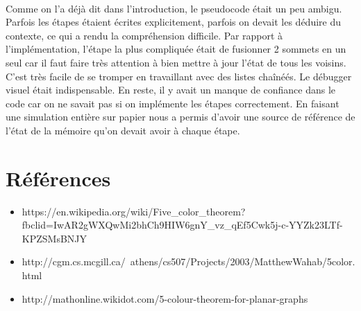 \documentclass[a4paper, 11pt, oneside]{article}
\begin{document}
	\paragraph{}
	Comme on l'a déjà dit dans l'introduction, le pseudocode était un peu ambigu. Parfois les étapes étaient écrites explicitement, parfois on devait les déduire du contexte, ce qui a rendu la compréhension difficile. Par rapport à l'implémentation, l'étape la plus compliquée était de fusionner 2 sommets en un seul car il faut faire très attention à bien mettre à jour l'état de tous les voisins. C'est très facile de se tromper en travaillant avec des listes chaînéés. Le débugger visuel était indispensable. En reste, il y avait un manque de confiance dans le code car on ne savait pas si on implémente les étapes correctement. En faisant une simulation entière sur papier nous a permis d'avoir une source de référence de l'état de la mémoire qu'on devait avoir à chaque étape.

	\section{Références}
	\begin{itemize}
		\item https://en.wikipedia.org/wiki/Five\_color\_theorem?fbclid=IwAR2gWXQwMi2bhCh9HIW6gnY\_vz\_qEf5Cwk5j-c-YYZk23LTf-KPZSMsBNJY
		\item http://cgm.cs.mcgill.ca/~athens/cs507/Projects/2003/MatthewWahab/5color.html
		\item http://mathonline.wikidot.com/5-colour-theorem-for-planar-graphs
	\end{itemize}
	
\end{document}
